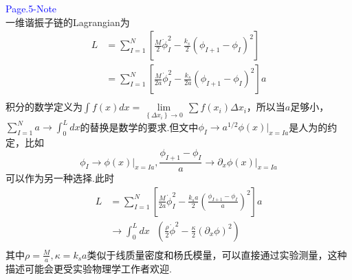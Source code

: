 \documentclass[12pt, a4paper, oneside]{ctexart}
\begin{document}
\textcolor{blue}{Page.5-Note}\\
一维谐振子链的Lagrangian为
\[\begin{aligned}
        L & =\sum\limits_{I=1}^{N}{\left[ \frac{M}{2}\dot{\phi }_{I}^{2}-\frac{{{k}_{s}}}{2}{{\left( {{\phi }_{I+1}}-{{\phi }_{I}} \right)}^{2}} \right]}    \\
          & =\sum\limits_{I=1}^{N}{\left[ \frac{M}{2a}\dot{\phi }_{I}^{2}-\frac{{{k}_{s}}}{2a}{{\left( {{\phi }_{I+1}}-{{\phi }_{I}} \right)}^{2}} \right]}a \\
    \end{aligned}\]
积分的数学定义为$\int{f\left( x \right)dx}=\underset{\left\{ \Delta {{x}_{i}} \right\}\to 0}{\mathop{\lim }}\,\sum{f\left( {{x}_{i}} \right)}\Delta {{x}_{i}}$，所以当$a$足够小，
$\sum\limits_{I=1}^{N}{a}\to \int_{0}^{L}{dx}$的替换是数学的要求.但文中${{\phi }_{I}}\to {{a}^{1/2}}{{\left. \phi \left( x \right) \right|}_{x=Ia}}$是人为的约定，比如
\[{{\phi }_{I}}\to {{\left. \phi \left( x \right) \right|}_{x=Ia}},\frac{{{\phi }_{I+1}}-{{\phi }_{I}}}{a}\to {{\left. {{\partial }_{x}}\phi \left( x \right) \right|}_{x=Ia}}\]
可以作为另一种选择.此时
\[\begin{aligned}
        L & =\sum\limits_{I=1}^{N}{\left[ \frac{M}{2a}\dot{\phi }_{I}^{2}-\frac{{{k}_{s}}a}{2}{{\left( \frac{{{\phi }_{I+1}}-{{\phi }_{I}}}{a} \right)}^{2}} \right]}a \\
          & \to \int_{0}^{L}{dx\text{ }\left( \frac{\rho }{2}{{{\dot{\phi }}}^{2}}-\frac{\kappa }{2}{{\left( {{\partial }_{x}}\phi  \right)}^{2}} \right)}             \\
    \end{aligned}\]
其中$\rho =\frac{M}{a},\kappa ={{k}_{s}}a$类似于线质量密度和杨氏模量，可以直接通过实验测量，这种描述可能会更受实验物理学工作者欢迎.
\end{document}
